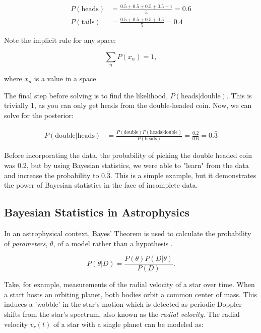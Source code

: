 \documentclass[preprint,longauthor]{aastex631}
\numberwithin{equation}{section}
\begin{document}
\begin{align*}
  P(\text{heads}) &= \frac{0.5+0.5+0.5+0.5+1}{5} = 0.6 \\
  P(\text{tails}) &= \frac{0.5+0.5+0.5+0.5}{5} = 0.4
\end{align*}

Note the implicit rule for any space:

\begin{equation}
  \sum_n P(x_n) = 1,
\end{equation}

where $x_n$ is a value in a space.

The final step before solving is to find the likelihood, $P(\text{heads}|\text{double})$. This is trivially 1, as you can only get heads from the double-headed coin. Now, we can solve for the posterior:

\begin{align*}
  P(\text{double}|\text{heads}) &= \frac{P(\text{double})P(\text{heads}|\text{double})}{P(\text{heads})} = \frac{0.2}{0.6} = \boxed{0.\bar{3}}
\end{align*}

Before incorporating the data, the probability of picking the double headed coin was $0.2$, but by using Bayesian statistics, we were able to "learn" from the data and increase the probability to $0.\bar{3}$. This is a simple example, but it demonstrates the power of Bayesian statistics in the face of incomplete data.

\subsection{Bayesian Statistics in Astrophysics}

In an astrophysical context, Bayes' Theorem is used to calculate the probability of \textit{parameters}, $\theta$, of a model rather than a hypothesis \citep{brewer1BayesianInference2018}.

\begin{equation}
  \label{eq:bayes_theorem_params}
  P(\theta|D) = \frac{P(\theta)P(D|\theta)}{P(D)}.
\end{equation}

Take, for example, measurements of the radial velocity of a star over time. When a start hosts an orbiting planet, both bodies orbit a common center of mass. This induces a 'wobble' in the star's motion which is detected as periodic Doppler shifts from the star's spectrum, also known as the \textit{radial velocity}. The radial velocity $v_r(t)$ of a star with a single planet can be modeled as:
\end{document}
